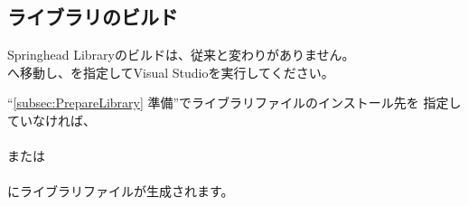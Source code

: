 \subsection{ライブラリのビルド}
\label{subsec:BuildLibrary}

\noindent
Springhead Libraryのビルドは、従来と変わりがありません。\\
\build へ移動し、を指定してVisual Studioを実行してください。

\medskip
``\ref{subsec:PrepareLibrary} 準備''でライブラリファイルのインストール先を
指定していなければ、\\
\hspace{20pt}\\
または\\
\hspace{20pt}\\
にライブラリファイルが生成されます。

